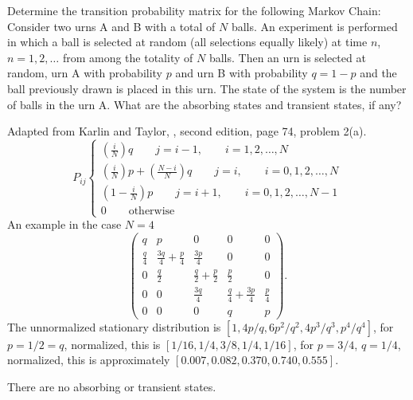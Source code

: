 \documentclass[12pt]{article}
\begin{document}
\begin{exercise}
    Determine the transition probability matrix for the following Markov
    Chain:  Consider two urns A and B with a total of \( N \) balls.  An
    experiment is performed in which a ball is selected at random (all
    selections equally likely) at time \( n \), \( n=1,2,\dots \) from
    among the totality of \( N \) balls.  Then an urn is selected at
    random, urn A with probability \( p \) and urn B with probability \(
    q = 1- p \) and the ball previously drawn is placed in this urn. The
    state of the system is the number of balls in the urn A. What are
    the absorbing states and transient states, if any?
\end{exercise}
\begin{solution}
    Adapted from Karlin and Taylor, , second edition, page 74, problem 2(a).
    \[
        P_{ij}
        \begin{cases}
            \left( \frac{i}{N}\right)q \qquad j = i-1, \qquad i=1,2,\dots,N
            \\
            \left( \frac{i}{N} \right) p + \left( \frac{N-i}{N} \right)
            q \qquad j = i, \qquad i=0,1,2,\dots,N \\
            \left( 1- \frac{i}{N} \right) p \qquad j = i+1, \qquad
            i=0,1,2,\dots,N-1 \\
            0 \qquad \text{otherwise}
        \end{cases}
    \] An example in the case \( N=4 \)
    \[
        \begin{pmatrix}
            q & p & 0 & 0 & 0\\
            \frac{q}{4} & \frac{3q}{4}+\frac{p}{4} & \frac{3p}{4} & 0 &
            0\\
            0 & \frac{q}{2} & \frac{q}{2}+\frac{p}{2} & \frac{p}{2} & 0\\
            0 & 0 & \frac{3q}{4} & \frac{q}{4}+\frac{3p}{4} & \frac{p}{4}\\
            0 & 0 & 0 & q & p
        \end{pmatrix}
        .
    \] The unnormalized stationary distribution is \( [1, 4p/q, 6p^2/q^2,
    4p^3/q^3, p^4/q^4 ] \), for \( p = 1/2 = q \), normalized, this is \(
    [ 1/16, 1/4, 3/8, 1/4, 1/16] \), for \( p =3/4 \), \( q = 1/4 \),
    normalized, this is approximately \( [0.007, 0.082, 0.370, 0.740,
    0.555] \).

    There are no absorbing or transient states.
  \end{solution}
  
\end{document}
